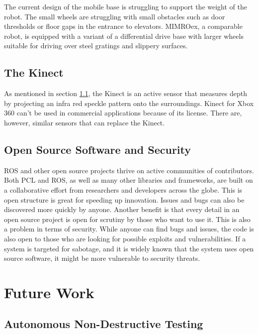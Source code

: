 The current design of the mobile base is struggling to support the weight of the robot. The small wheels are struggling with small obstacles such as door thresholds or floor gaps in the entrance to elevators. \ac{MIMROex}, a comparable robot, is equipped with a variant of a differential drive base with larger wheels suitable for driving over steel gratings and slippery surfaces.



\subsection{The Kinect}

As mentioned in section \ref{}, the Kinect is an active sensor that measures depth by projecting an infra red speckle pattern onto the surroundings.  Kinect for Xbox 360 can't be used in commercial applications because of its license. There are, however, similar sensors that can replace the Kinect.

\subsection{Open Source Software and Security}

\ac{ROS} and other open source projects thrive on active communities of contributors. Both \ac{PCL} and \ac{ROS}, as well as many other libraries and frameworks, are built on a collaborative effort from researchers and developers across the globe. This is open structure is great for speeding up innovation. Issues and bugs can also be discovered more quickly by anyone. Another benefit is that every detail in an open source project is open for scrutiny by those who want to use it. This is also a problem in terms of security. While anyone can find bugs and issues, the code is also open to those who are looking for possible exploits and vulnerabilities. If a system is targeted for sabotage, and it is widely known that the system uses open source software, it might be more vulnerable to security threats.

\section{Future Work}

\subsection{Autonomous Non-Destructive Testing}

